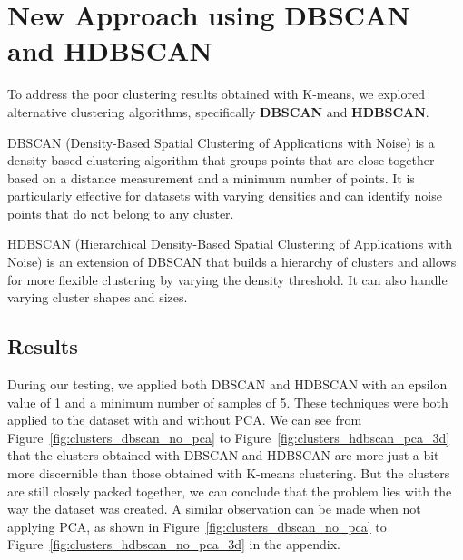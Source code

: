 \section{New Approach using DBSCAN and HDBSCAN}
\label{subsec:new_approach_dbscan_hdbscan}

To address the poor clustering results obtained with K-means, we explored alternative clustering algorithms, specifically
\textbf{DBSCAN} and \textbf{HDBSCAN}.

DBSCAN (Density-Based Spatial Clustering of Applications with Noise) is a density-based clustering algorithm that
groups points that are close together based on a distance measurement and a minimum number of points. It is particularly
effective for datasets with varying densities and can identify noise points that do not belong to any cluster.

HDBSCAN (Hierarchical Density-Based Spatial Clustering of Applications with Noise) is an extension of DBSCAN that builds
a hierarchy of clusters and allows for more flexible clustering by varying the density threshold. It can also handle varying
cluster shapes and sizes.

\subsection{Results}
\label{subsec:results_dbscan_hdbscan}

During our testing, we applied both DBSCAN and HDBSCAN with an epsilon value of 1 and a minimum number of samples of 5.
These techniques were both applied to the dataset with and without PCA. We can see from Figure~\ref{fig:clusters_dbscan_no_pca}
to Figure~\ref{fig:clusters_hdbscan_pca_3d} that the clusters obtained with DBSCAN and HDBSCAN are more just a bit more
discernible than those obtained with K-means clustering. But the clusters are still closely packed together, we can conclude
that the problem lies with the way the dataset was created. A similar observation can be made when not applying PCA, as shown
in Figure~\ref{fig:clusters_dbscan_no_pca} to Figure~\ref{fig:clusters_hdbscan_no_pca_3d} in the appendix.

